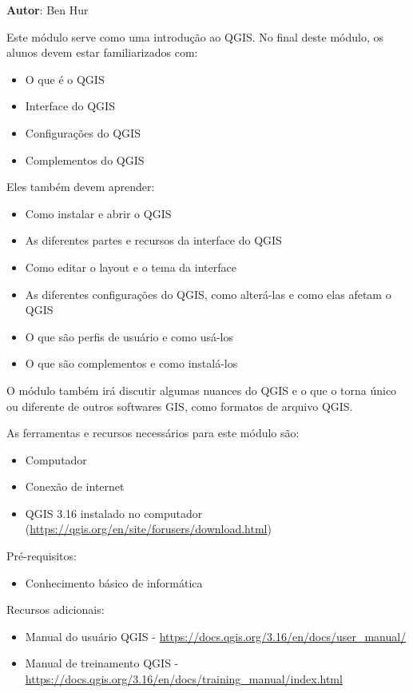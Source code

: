 \documentclass[
]{krantz}
\providecommand{\tightlist}{%
  \setlength{\itemsep}{0pt}\setlength{\parskip}{0pt}}
\begin{document}
\textbf{Autor}: Ben Hur

Este módulo serve como uma introdução ao QGIS. No final deste módulo, os alunos devem estar familiarizados com:

\begin{itemize}
\tightlist
\item
  O que é o QGIS
\item
  Interface do QGIS
\item
  Configurações do QGIS
\item
  Complementos do QGIS
\end{itemize}

Eles também devem aprender:

\begin{itemize}
\tightlist
\item
  Como instalar e abrir o QGIS
\item
  As diferentes partes e recursos da interface do QGIS
\item
  Como editar o layout e o tema da interface
\item
  As diferentes configurações do QGIS, como alterá-las e como elas afetam o QGIS
\item
  O que são perfis de usuário e como usá-los
\item
  O que são complementos e como instalá-los
\end{itemize}

O módulo também irá discutir algumas nuances do QGIS e o que o torna único ou diferente de outros softwares GIS, como formatos de arquivo QGIS.

As ferramentas e recursos necessários para este módulo são:

\begin{itemize}
\tightlist
\item
  Computador
\item
  Conexão de internet
\item
  QGIS 3.16 instalado no computador (\url{https://qgis.org/en/site/forusers/download.html})
\end{itemize}

Pré-requisitos:

\begin{itemize}
\tightlist
\item
  Conhecimento básico de informática
\end{itemize}

Recursos adicionais:

\begin{itemize}
\tightlist
\item
  Manual do usuário QGIS - \url{https://docs.qgis.org/3.16/en/docs/user_manual/}
\item
  Manual de treinamento QGIS - \url{https://docs.qgis.org/3.16/en/docs/training_manual/index.html}
\end{itemize}
\end{document}
